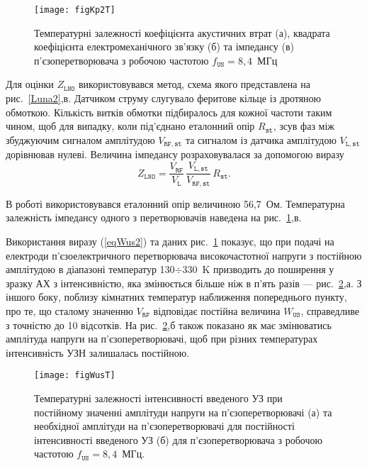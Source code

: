 \begin{figure}
\center
\texttt{[image: figKp2T]}%
\caption{\label{figKp2T}
Температурні залежності коефіцієнта акустичних втрат (а),
квадрата коефіцієнта електромеханічного зв'язку (б) та
імпедансу (в) п'єзоперетворювача з робочою частотою $f_\mathtt{US}=8,4$~МГц}
\end{figure}

Для оцінки $Z_\mathtt{LNO}$ використовувався метод,
схема якого представлена на рис.~\ref{Luna2},в.
Датчиком струму слугувало феритове кільце із дротяною обмоткою.
Кількість витків обмотки підбиралось для кожної частоти таким чином, щоб для випадку, коли під'єднано еталонний опір $R_\mathtt{st}$,
зсув фаз між збуджуючим сигналом амплітудою $V_\mathtt{RF,st}$ та сигналом із датчика амплітудою $V_\mathtt{L,st}$
дорівнював нулеві.
Величина імпедансу розраховувалася за допомогою виразу
 \begin{equation}
 \label{eqZlno}
 Z_\mathtt{LNO}=\frac{V_\mathtt{RF}}{V_\mathtt{L}}\,\frac{V_\mathtt{L,st}}{V_\mathtt{RF,st}}\,R_\mathtt{st}.
 \end{equation}

В роботі використовувався еталонний опір величиною 56,7~Ом.
Температурна залежність імпедансу одного з перетворювачів наведена на рис.~\ref{figKp2T},в.

Використання виразу (\ref{eqWus2}) та даних рис.~\ref{figKp2T} показує, що при подачі на електроди п'єзоелектричного перетворювача
високочастотної напруги з постійною амплітудою в діапазоні температур 130$\div$330~K призводить до поширення у зразку АХ з
інтенсивністю, яка змінюється більше ніж в п'ять разів --- рис.~\ref{figWusT},а.
З іншого боку, поблизу кімнатних температур наближення попереднього пункту, про те, що сталому значенню
$V_\mathtt{RF}$ відповідає постійна величина $ W_\mathtt{US}$, справедливе з точністю до 10 відсотків.
На рис.~\ref{figWusT},б також показано як має змінюватись амплітуда напруги на п'єзоперетворювачі, щоб при різних температурах
інтенсивність УЗН залишалась постійною.


\begin{figure}
\center
\texttt{[image: figWusT]}%
\caption{\label{figWusT}
Температурні залежності
інтенсивності введеного УЗ при постійному значенні амплітуди напруги на п'єзоперетворювачі (а)
та необхідної амплітуди на п'єзоперетворювачі для постійності інтенсивності введеного УЗ (б)
для п'єзоперетворювача з робочою частотою $f_\mathtt{US}=8,4$~МГц.
}
\end{figure}




